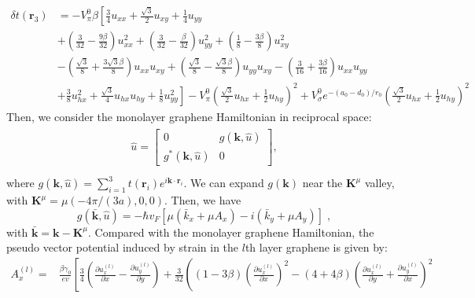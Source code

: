 \documentclass[aps,prx,10pt,twocolumn,superscriptaddress]{revtex4}
\begin{document}
\begin{widetext}
\begin{align}
\delta t(\textbf{r}_{3})&=-V^{0}_{\pi}\beta\left[\frac{3}{4}u_{xx}+\frac{\sqrt{3}}{2}u_{xy}+\frac{1}{4}u_{yy}\right.\nonumber\\
&+\left(\frac{3}{32}-\frac{9\beta}{32}\right)u^{2}_{xx}+\left(\frac{3}{32}-\frac{\beta}{32}\right)u^{2}_{yy}+\left(\frac{1}{8}-\frac{3\beta}{8}\right)u^{2}_{xy}\nonumber\\
&-\left(\frac{\sqrt{3}}{8}+\frac{3\sqrt{3}\beta}{8}\right)u_{xx}u_{xy}+\left(\frac{\sqrt{3}}{8}-\frac{\sqrt{3}\beta}{8}\right)u_{yy}u_{xy}-\left(\frac{3}{16}+\frac{3\beta}{16}\right)u_{xx}u_{yy}\nonumber\\
&+\left.\frac{3}{8}u^{2}_{hx}+\frac{\sqrt{3}}{4}u_{hx}u_{hy}+\frac{1}{8}u^{2}_{yy}\right]-V^{0}_{\pi}\left(\frac{\sqrt{3}}{2}u_{hx}+\frac{1}{2}u_{hy}\right)^{2}+V^{0}_{\sigma}e^{-(a_{0}-d_{0})/r_{0}}\left(\frac{\sqrt{3}}{2}u_{hx}+\frac{1}{2}u_{hy}\right)^{2}
\end{align}
Then, we consider the monolayer graphene Hamiltonian in reciprocal space:
\begin{align}\label{strain}
\begin{split}
\hat{u}=\left[\begin{array}{cc}
				0 & g(\textbf{k},\hat{u})  \\
				g^{*}(\textbf{k},\hat{u}) & 0
\end{array}\right],\\
\end{split}
\end{align}
where $g(\textbf{k},\hat{u})\!=\!\sum^{3}_{i=1}t(\textbf{r}_{i})e^{i\textbf{k}\cdot\textbf{r}_{i}}$. We can expand $g(\textbf{k})$ near the $\mathbf{K}^{\mu}$ valley, with $\mathbf{K}^{\mu}\!=\!\mu(-4\pi/(3a),0,0)$. Then, we have 
\begin{equation}
g(\bar{\textbf{k}},\hat{u})=-\hbar v_{F}[\mu(\bar{k}_{x}+\mu A_{x})-i(\bar{k}_{y}+\mu A_{y})]\;, 
\end{equation}
with $\bar{\textbf{k}}\!=\!\textbf{k}-\textbf{K}^{\mu}$.
Compared with the monolayer graphene Hamiltonian, the pseudo vector potential induced by strain in the $l$th layer  graphene is given by:
\allowdisplaybreaks
\begin{align}
A_{x}^{(l)}=&\frac{\beta\gamma_{0}}{ev}\left[\frac{3}{4}(\frac{\partial u^{(l)}_{x}}{\partial x}-\frac{\partial u^{(l)}_{y}}{\partial y})+\frac{3}{32}\left((1-3\beta)\left(\frac{\partial u^{(l)}_{x}}{\partial x}\right)^{2}-(4+4\beta)\left(\frac{\partial u^{(l)}_{x}}{\partial y}+\frac{\partial u^{(l)}_{y}}{\partial x}\right)^{2}\right.\right.\nonumber\\

\end{align}
\end{widetext}
\end{document}
